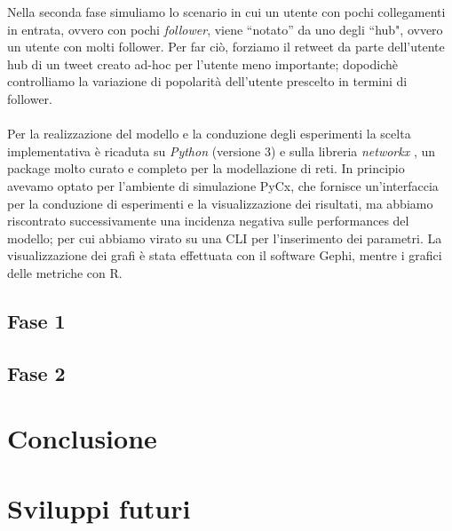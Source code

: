 \documentclass[a4paper,12pt]{article}
\begin{document}
Nella seconda fase simuliamo lo scenario in cui un utente con pochi collegamenti in entrata, ovvero con pochi \textit{follower}, viene ``notato'' da uno degli ``hub", ovvero un utente con molti follower. Per far ciò, forziamo il retweet da parte dell'utente hub di un tweet creato ad-hoc per l'utente meno importante; dopodichè controlliamo la variazione di popolarità  dell'utente prescelto in termini di follower.
\\
\\
Per la realizzazione del modello e la conduzione degli esperimenti la scelta implementativa è ricaduta su \textit{Python} (versione 3) e sulla libreria \textit{networkx} \cite{nx}, un package molto curato e completo per la modellazione di reti. In principio avevamo optato per l'ambiente di simulazione PyCx, che fornisce un'interfaccia per la conduzione di esperimenti e la visualizzazione dei risultati, ma abbiamo riscontrato successivamente una incidenza negativa sulle performances del modello; per cui abbiamo virato su una CLI per l'inserimento dei parametri. La visualizzazione dei grafi è stata effettuata con il software Gephi, mentre i grafici delle metriche con R.
\subsection{Fase 1}
\subsection{Fase 2}
\section{Conclusione}
\label{sec:end}
\section{Sviluppi futuri}
\label{sec:future}
\end{document}
